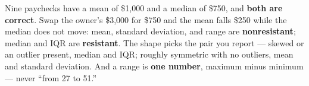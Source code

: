 \documentclass[12pt]{article}
\begin{document}
\vspace{0.14in}

\boxguard[8]
\begin{remindbox}
\small
Nine paychecks have a mean of \$1{,}000 and a median of \$750, and \textbf{both are correct}.
Swap the owner's \$3{,}000 for \$750 and the mean falls \$250 while the median does not move:
mean, standard deviation, and range are \textbf{nonresistant}; median and IQR are
\textbf{resistant}. The shape picks the pair you report --- skewed or an outlier present, median
and IQR; roughly symmetric with no outliers, mean and standard deviation. And a range is
\textbf{one number}, maximum minus minimum --- never ``from 27 to 51.''
\end{remindbox}
\end{document}
